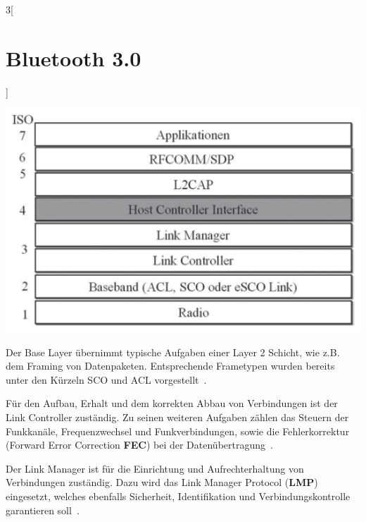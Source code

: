 \begin{multicols}{3}[\section{Bluetooth 3.0}]
\begin{Figure}
\includegraphics[width=\linewidth]{Kapitel/Bluetooth3.0/Grafiken/Protokoll_Stack.png}
\label{fig:ProtokollStack}
\end{Figure}

\noindent
Der Base Layer übernimmt typische Aufgaben einer Layer 2 Schicht, wie z.B. dem Framing von Datenpaketen. Entsprechende Frametypen wurden bereits unter den Kürzeln SCO und ACL vorgestellt~\cite{bluetooth3.0.1}. 

Für den Aufbau, Erhalt und dem korrekten Abbau von Verbindungen ist der Link Controller \hspace{1px} zuständig. Zu \hspace{1px} seinen \hspace{1px} weiteren \hspace{1px} Aufgaben zählen das Steuern der Funkkanäle, Frequenzwechsel und Funkverbindungen, sowie die Fehlerkorrektur (Forward Error Correction \textbf{FEC}) bei der Datenübertragung~\cite{bluetooth3.0.3}.

Der Link Manager ist für die Einrichtung und Aufrechterhaltung von Verbindungen zuständig. Dazu wird das Link Manager Protocol (\textbf{LMP}) eingesetzt, welches ebenfalls Sicherheit, Identifikation und Verbindungskontrolle garantieren soll~\cite{bluetooth3.0.3}.

\end{multicols}

